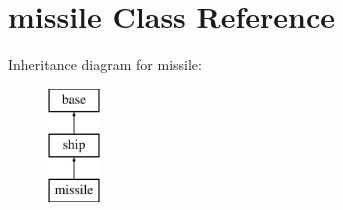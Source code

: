 \hypertarget{classmissile}{\section{missile Class Reference}
\label{classmissile}
}
Inheritance diagram for missile\-:\begin{figure}[H]
\begin{center}
\leavevmode
\includegraphics[height=3.000000cm]{classmissile}
\end{center}
\end{figure}
